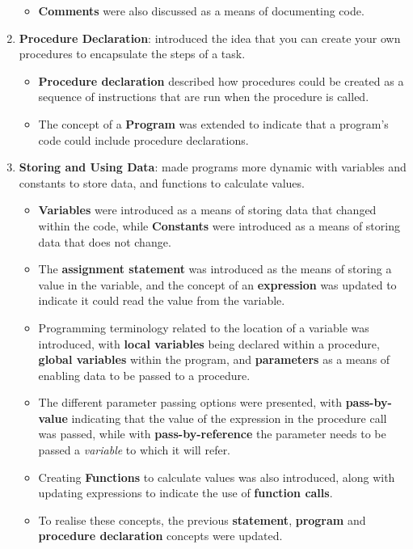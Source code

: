 \begin{enumerate}
\begin{itemize}[noitemsep,nolistsep]
    \item \textbf{Comments} were also discussed as a means of documenting code.
  \end{itemize}
  \item \textbf{Procedure Declaration}: introduced the idea that you can create your own procedures to encapsulate the steps of a task. 
  \begin{itemize}[noitemsep,nolistsep]
     \item \textbf{Procedure declaration} described how procedures could be created as a sequence of instructions that are run when the procedure is called.
     \item The concept of a \textbf{Program} was extended to indicate that a program's code could include procedure declarations.
   \end{itemize} 
  \item \textbf{Storing and Using Data}: made programs more dynamic with variables and constants to store data, and functions to calculate values.
  \begin{itemize}[noitemsep,nolistsep]
    \item \textbf{Variables} were introduced as a means of storing data that changed within the code, while \textbf{Constants} were introduced as a means of storing data that does not change. 
    \item The \textbf{assignment statement} was introduced as the means of storing a value in the variable, and the concept of an \textbf{expression} was updated to indicate it could read the value from the variable.
    \item Programming terminology related to the location of a variable was introduced, with \textbf{local variables} being declared within a procedure, \textbf{global variables} within the program, and \textbf{parameters} as a means of enabling data to be passed to a procedure.
    \item The different parameter passing options were presented, with \textbf{pass-by-value} indicating that the value of the expression in the procedure call was passed, while with \textbf{pass-by-reference} the parameter needs to be passed a \emph{variable} to which it will refer.
    \item Creating \textbf{Functions} to calculate values was also introduced, along with updating expressions to indicate the use of \textbf{function calls}.
    \item To realise these concepts, the previous \textbf{statement}, \textbf{program} and \textbf{procedure declaration} concepts were updated.

\end{itemize}
\end{enumerate}
